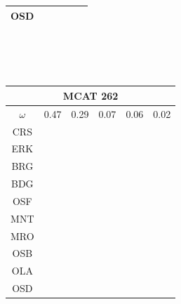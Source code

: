 \documentclass[12pt]{article}
\begin{document}
\begin{landscape}
\begin{figure}
\begin{minipage}[c]{0.3\textwidth}
\begin{tabular}{|c|c|c|c|c|c|}
        OSD&\cellcolor[HTML]{FFFF33}&\cellcolor[HTML]{984EA3}&\cellcolor[HTML]{FF7F00}&\cellcolor[HTML]{FF7F00}&\cellcolor[HTML]{FF7F00} \\ \hline
\end{tabular}\\$~$\\$~$\\
\hspace*{-5cm}
\begin{tabular}{|c|c|c|c|c|c|}
         \hline \multicolumn{6}{|c|}{MCAT 262} \\ \hline
         $\omega$&0.47&0.29&0.07&0.06&0.02 \\ \hline
        CRS&\cellcolor[HTML]{E41A1C}&\cellcolor[HTML]{E41A1C}&\cellcolor[HTML]{E41A1C}&\cellcolor[HTML]{E41A1C}&\cellcolor[HTML]{E41A1C} \\ \hline
        ERK&\cellcolor[HTML]{E41A1C}&\cellcolor[HTML]{E41A1C}&\cellcolor[HTML]{E41A1C}&\cellcolor[HTML]{E41A1C}&\cellcolor[HTML]{E41A1C} \\ \hline
        BRG&\cellcolor[HTML]{E41A1C}&\cellcolor[HTML]{E41A1C}&\cellcolor[HTML]{377EB8}&\cellcolor[HTML]{E41A1C}&\cellcolor[HTML]{E41A1C} \\ \hline
        BDG&\cellcolor[HTML]{377EB8}&\cellcolor[HTML]{377EB8}&\cellcolor[HTML]{377EB8}&\cellcolor[HTML]{377EB8}&\cellcolor[HTML]{377EB8} \\ \hline
        OSF&\cellcolor[HTML]{377EB8}&\cellcolor[HTML]{377EB8}&\cellcolor[HTML]{377EB8}&\cellcolor[HTML]{377EB8}&\cellcolor[HTML]{4DAF4A} \\ \hline
        MNT&\cellcolor[HTML]{4DAF4A}&\cellcolor[HTML]{4DAF4A}&\cellcolor[HTML]{4DAF4A}&\cellcolor[HTML]{377EB8}&\cellcolor[HTML]{4DAF4A} \\ \hline
        MRO&\cellcolor[HTML]{4DAF4A}&\cellcolor[HTML]{4DAF4A}&\cellcolor[HTML]{4DAF4A}&\cellcolor[HTML]{4DAF4A}&\cellcolor[HTML]{4DAF4A} \\ \hline
        OSB&\cellcolor[HTML]{4DAF4A}&\cellcolor[HTML]{4DAF4A}&\cellcolor[HTML]{4DAF4A}&\cellcolor[HTML]{4DAF4A}&\cellcolor[HTML]{984EA3} \\ \hline
        OLA&\cellcolor[HTML]{984EA3}&\cellcolor[HTML]{984EA3}&\cellcolor[HTML]{984EA3}&\cellcolor[HTML]{984EA3}&\cellcolor[HTML]{984EA3} \\ \hline
        OSD&\cellcolor[HTML]{984EA3}&\cellcolor[HTML]{FF7F00}&\cellcolor[HTML]{984EA3}&\cellcolor[HTML]{FF7F00}&\cellcolor[HTML]{984EA3} \\ \hline
\end{tabular}

\end{minipage}
\end{figure}
\end{landscape}
\end{document}
